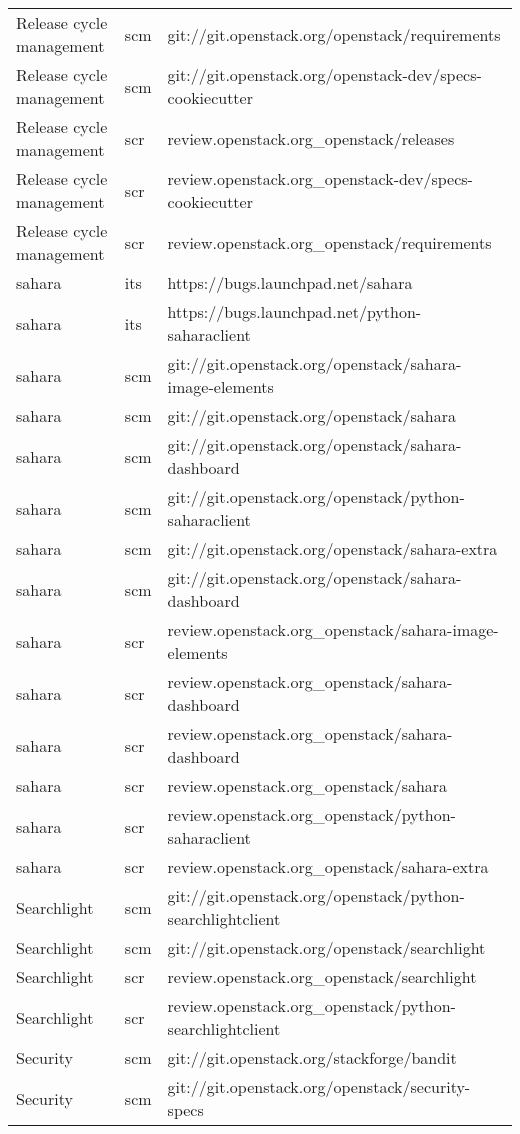 \begin{center}
\begin{longtable}{|p{4cm}|p{1cm}|p{10cm}|}
Release cycle management&scm&git://git.openstack.org/openstack/requirements\\ 
Release cycle management&scm&git://git.openstack.org/openstack-dev/specs-cookiecutter\\ 
Release cycle management&scr&review.openstack.org\_openstack/releases\\ 
Release cycle management&scr&review.openstack.org\_openstack-dev/specs-cookiecutter\\ 
Release cycle management&scr&review.openstack.org\_openstack/requirements\\ 
sahara&its&https://bugs.launchpad.net/sahara\\ 
sahara&its&https://bugs.launchpad.net/python-saharaclient\\ 
sahara&scm&git://git.openstack.org/openstack/sahara-image-elements\\ 
sahara&scm&git://git.openstack.org/openstack/sahara\\ 
sahara&scm&git://git.openstack.org/openstack/sahara-dashboard\\ 
sahara&scm&git://git.openstack.org/openstack/python-saharaclient\\ 
sahara&scm&git://git.openstack.org/openstack/sahara-extra\\ 
sahara&scm&git://git.openstack.org/openstack/sahara-dashboard\\ 
sahara&scr&review.openstack.org\_openstack/sahara-image-elements\\ 
sahara&scr&review.openstack.org\_openstack/sahara-dashboard\\ 
sahara&scr&review.openstack.org\_openstack/sahara-dashboard\\ 
sahara&scr&review.openstack.org\_openstack/sahara\\ 
sahara&scr&review.openstack.org\_openstack/python-saharaclient\\ 
sahara&scr&review.openstack.org\_openstack/sahara-extra\\ 
Searchlight&scm&git://git.openstack.org/openstack/python-searchlightclient\\ 
Searchlight&scm&git://git.openstack.org/openstack/searchlight\\ 
Searchlight&scr&review.openstack.org\_openstack/searchlight\\ 
Searchlight&scr&review.openstack.org\_openstack/python-searchlightclient\\ 
Security&scm&git://git.openstack.org/stackforge/bandit\\ 
Security&scm&git://git.openstack.org/openstack/security-specs\\ 

\end{longtable}
\end{center}

